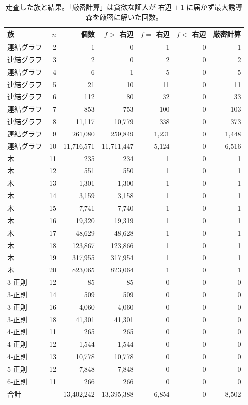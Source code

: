 \documentclass[paper=a4,fontsize=10.5pt,jafontsize=10.5pt]{jlreq}
\theoremstyle{plain}
\theoremstyle{definition}
\begin{document}
\begin{table}[htbp]
\centering
\caption{走査した族と結果。「厳密計算」は貪欲な証人が
右辺 $+\,1$ に届かず最大誘導森を厳密に解いた回数。}
\label{tab:fams}
\begin{tabular}{lrrrrrr}
\toprule
族 & $n$ & 個数 & $f >$ 右辺 & $f =$ 右辺 & $f <$ 右辺 & 厳密計算 \\
\midrule
連結グラフ & 2 & 1 & 0 & 1 & 0 & 1 \\
連結グラフ & 3 & 2 & 0 & 2 & 0 & 2 \\
連結グラフ & 4 & 6 & 1 & 5 & 0 & 5 \\
連結グラフ & 5 & 21 & 10 & 11 & 0 & 11 \\
連結グラフ & 6 & 112 & 80 & 32 & 0 & 33 \\
連結グラフ & 7 & 853 & 753 & 100 & 0 & 103 \\
連結グラフ & 8 & 11,117 & 10,779 & 338 & 0 & 373 \\
連結グラフ & 9 & 261,080 & 259,849 & 1,231 & 0 & 1,448 \\
連結グラフ & 10 & 11,716,571 & 11,711,447 & 5,124 & 0 & 6,516 \\
木 & 11 & 235 & 234 & 1 & 0 & 1 \\
木 & 12 & 551 & 550 & 1 & 0 & 1 \\
木 & 13 & 1,301 & 1,300 & 1 & 0 & 1 \\
木 & 14 & 3,159 & 3,158 & 1 & 0 & 1 \\
木 & 15 & 7,741 & 7,740 & 1 & 0 & 1 \\
木 & 16 & 19,320 & 19,319 & 1 & 0 & 1 \\
木 & 17 & 48,629 & 48,628 & 1 & 0 & 1 \\
木 & 18 & 123,867 & 123,866 & 1 & 0 & 1 \\
木 & 19 & 317,955 & 317,954 & 1 & 0 & 1 \\
木 & 20 & 823,065 & 823,064 & 1 & 0 & 1 \\
3-正則 & 12 & 85 & 85 & 0 & 0 & 0 \\
3-正則 & 14 & 509 & 509 & 0 & 0 & 0 \\
3-正則 & 16 & 4,060 & 4,060 & 0 & 0 & 0 \\
3-正則 & 18 & 41,301 & 41,301 & 0 & 0 & 0 \\
4-正則 & 11 & 265 & 265 & 0 & 0 & 0 \\
4-正則 & 12 & 1,544 & 1,544 & 0 & 0 & 0 \\
4-正則 & 13 & 10,778 & 10,778 & 0 & 0 & 0 \\
5-正則 & 12 & 7,848 & 7,848 & 0 & 0 & 0 \\
6-正則 & 11 & 266 & 266 & 0 & 0 & 0 \\
\midrule
\multicolumn{2}{l}{合計} & 13,402,242 & 13,395,388 & 6,854
& 0 & 8,502 \\
\bottomrule
\end{tabular}
\end{table}
\end{document}
